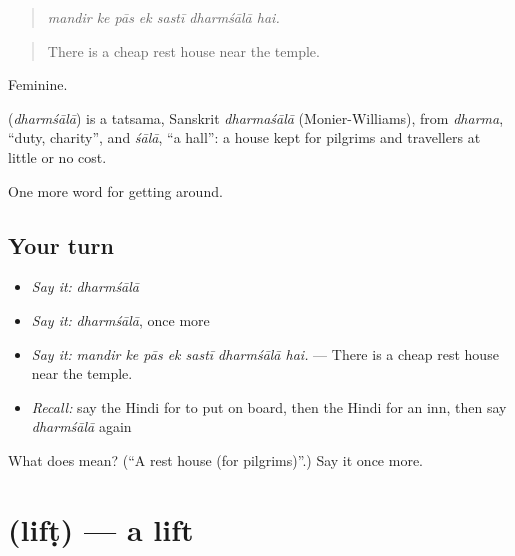 \begin{quote}
      
\end{quote}

\begin{quote}
\emph{mandir ke pās ek sastī dharmśālā hai.}
\end{quote}

\begin{quote}
There is a cheap rest house near the temple.
\end{quote}

Feminine.

\begin{cousinweb}
\textbf{} (\emph{dharmśālā}) is a tatsama, Sanskrit \emph{dharmaśālā} (Monier-Williams), from \emph{dharma}, \textquotedblleft{}duty, charity\textquotedblright{}, and \emph{śālā}, \textquotedblleft{}a hall\textquotedblright{}: a house kept for pilgrims and travellers at little or no cost.
\end{cousinweb}

\begin{grammarlens}[title={What you've built}]
One more word for getting around.
\end{grammarlens}

\subsection*{Your turn}
\begin{itemize}
\raggedright
  \item \emph{Say it:} \emph{dharmśālā}
  \item \emph{Say it:} \emph{dharmśālā}, once more
  \item \emph{Say it:} \emph{mandir ke pās ek sastī dharmśālā hai.} — There is a cheap rest house near the temple.
  \item \emph{Recall:} say the Hindi for to put on board, then the Hindi for an inn, then say \emph{dharmśālā} again
\end{itemize}

\begin{tcolorbox}[breakable,colback=teal!4,colframe=teal!35!black,title={Before you move on}]
What does  mean? (\textquotedblleft{}A rest house (for pilgrims)\textquotedblright{}.) Say it once more.
\end{tcolorbox}
\section[\texorpdfstring{\hi{लिफ़्ट} (lifṭ)}{लिफ़्ट (lifṭ)}]{ (lifṭ) — a lift}


